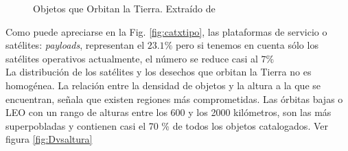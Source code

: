 \begin{figure}[!h]
\centering
  \caption[Objetos en \'Orbita]{Objetos que Orbitan la Tierra. Extra\'ido de \cite{ODQN}}
\end{figure}
Como puede apreciarse en la Fig. \ref{fig:catxtipo}, las plataformas de servicio o sat\'elites: {\it{payloads}}, representan el $23.1 \%$ pero si tenemos en cuenta s\'olo los sat\'elites operativos actualmente, el n\'umero se reduce casi al $7\%$ \\

La distribuci\'on de los sat\'elites y los  desechos que orbitan la Tierra no es homog\'enea. La relaci\'on entre la densidad de objetos y la altura a la que se encuentran, señala que existen regiones m\'as comprometidas.
Las \'orbitas bajas o \ac{LEO} con un rango de alturas entre los 600 y los 2000 kil\'ometros, son las m\'as superpobladas y contienen casi el 70 \% de todos los objetos catalogados. Ver figura \ref{fig:Dvsaltura}

